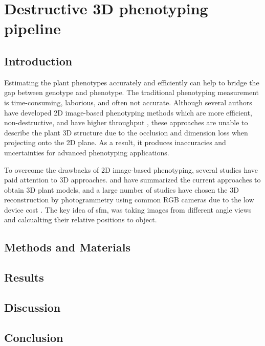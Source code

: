 \chapter{Destructive 3D phenotyping pipeline}

\section{Introduction}

Estimating the plant phenotypes accurately and efficiently can help to bridge the gap between genotype and phenotype. The traditional phenotyping measurement is time-consuming, laborious, and often not accurate. Although several authors have developed 2D image-based phenotyping methods which are more efficient, non-destructive, and have higher throughput \citep{yang_greenness_2015,guo_easypcc_2017,zou_broccoli_2019}, these approaches are unable to describe the plant 3D structure due to the occlusion and dimension loss when projecting onto the 2D plane. As a result, it produces inaccuracies and uncertainties for advanced phenotyping applications.

To overcome the drawbacks of 2D image-based phenotyping, several studies have paid attention to 3D approaches. \citet{paulus_measuring_2019} and \citet{kochi_introduction_2021} have summarized the current approaches to obtain 3D plant models, and a large number of studies have chosen the 3D reconstruction by photogrammetry using common RGB cameras due to the low device cost \citep{xiao_estimating_2021,zermas_3d_2020,zhang_estimating_2016}. The key idea of sfm, was taking images from different angle views and calcualting their relative positions to object.






\section{Methods and Materials}




\section{Results}



\section{Discussion}



\section{Conclusion}